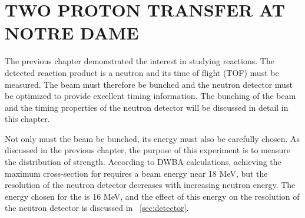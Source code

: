 %
%
%
%
%
%
%
%

%
%

\chapter{TWO PROTON TRANSFER AT NOTRE DAME}
\label{chap:2pExpt}

The previous chapter demonstrated the interest in studying \reaction reactions.  The detected reaction product is a neutron and its time of flight (TOF) must be measured.  The beam must therefore be bunched and the neutron detector must be optimized to provide excellent timing information.  The bunching of the beam and the timing properties of the neutron detector will be discussed in detail in this chapter.   


Not only must the beam be bunched, its energy must also be carefully chosen.  As discussed in the previous chapter, the purpose of this experiment is to measure the distribution of \zp strength.  According to DWBA calculations, achieving the maximum \zp cross-section for \reaction requires a beam energy near 18 MeV, but the resolution of the neutron detector decreases with increasing neutron energy.  The energy chosen for the  is 16 MeV, and the effect of this energy on the resolution of the neutron detector is discussed in {\sect}~\ref{sec:detector}.


